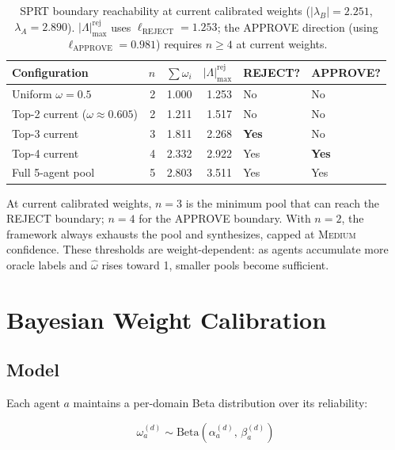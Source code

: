 \documentclass[11pt,a4paper]{article}
\begin{document}
\begin{table}[h]
\centering
\begin{tabular}{lrrrll}
\toprule
Configuration & $n$ & $\sum\omega_i$ & $|\Lambda|_{\max}^{\text{rej}}$ & REJECT? & APPROVE? \\
\midrule
Uniform $\omega=0.5$           & 2 & 1.000 & 1.253 & No  & No \\
Top-2 current ($\omega{\approx}0.605$)  & 2 & 1.211 & 1.517 & No  & No \\
Top-3 current                   & 3 & 1.811 & 2.268 & \textbf{Yes} & No \\
Top-4 current                   & 4 & 2.332 & 2.922 & Yes & \textbf{Yes} \\
Full 5-agent pool               & 5 & 2.803 & 3.511 & Yes & Yes \\
\bottomrule
\end{tabular}
\caption{SPRT boundary reachability at current calibrated weights
($|\lambda_B|=2.251$, $\lambda_A=2.890$). $|\Lambda|_{\max}^{\text{rej}}$ uses
$\ell_{\text{REJECT}}=1.253$; the APPROVE direction (using $\ell_{\text{APPROVE}}=0.981$)
requires $n\geq 4$ at current weights.}
\label{tab:reachability}
\end{table}

At current calibrated weights, $n=3$ is the minimum pool that can reach the
REJECT boundary; $n=4$ for the APPROVE boundary. With $n=2$, the framework
always exhausts the pool and synthesizes, capped at \textsc{Medium} confidence.
These thresholds are weight-dependent: as agents accumulate more oracle labels
and $\hat\omega$ rises toward 1, smaller pools become sufficient.

\section{Bayesian Weight Calibration}

\subsection{Model}

Each agent $a$ maintains a per-domain Beta distribution over its reliability:

\begin{equation}
  \omega_a^{(d)} \sim \text{Beta}\!\left(\alpha_a^{(d)},\, \beta_a^{(d)}\right)
\end{equation}
\end{document}
